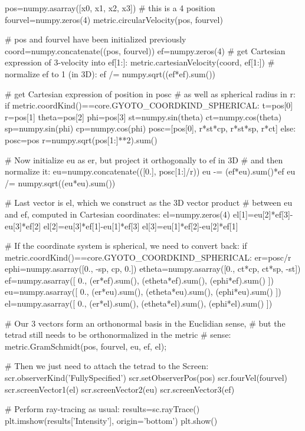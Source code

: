 \documentclass[a4paper,12pt]{article}
\begin{document}
\begin{code}
  pos=numpy.asarray([x0, x1, x2, x3]) # this is a 4 position
  fourvel=numpy.zeros(4)
  metric.circularVelocity(pos, fourvel)

  # pos and fourvel have been initialized previously
  coord=numpy.concatenate((pos, fourvel))
  ef=numpy.zeros(4)
  # get Cartesian expression of 3-velocity into ef[1:]:
  metric.cartesianVelocity(coord, ef[1:])
  # normalize ef to 1 (in 3D):
  ef /= numpy.sqrt((ef*ef).sum())

  # get Cartesian expression of position in posc
  # as well as spherical radius in r:
  if metric.coordKind()==core.GYOTO_COORDKIND_SPHERICAL:
      t=pos[0]
      r=pos[1]
      theta=pos[2]
      phi=pos[3]
      st=numpy.sin(theta)
      ct=numpy.cos(theta)
      sp=numpy.sin(phi)
      cp=numpy.cos(phi)
      posc=[pos[0], r*st*cp, r*st*sp, r*ct]
  else:
      posc=pos
      r=numpy.sqrt(pos[1:]**2).sum()

  # Now initialize eu as er, but project it orthogonally to ef in 3D
  # and then normalize it:    
  eu=numpy.concatenate(([0.], posc[1:]/r))
  eu -= (ef*eu).sum()*ef
  eu /= numpy.sqrt((eu*eu).sum())

  # Last vector is el, which we construct as the 3D vector product
  # between eu and ef, computed in Cartesian coordinates:
  el=numpy.zeros(4)
  el[1]=eu[2]*ef[3]-eu[3]*ef[2]
  el[2]=eu[3]*ef[1]-eu[1]*ef[3]
  el[3]=eu[1]*ef[2]-eu[2]*ef[1]

  # If the coordinate system is spherical, we need to convert back:
  if metric.coordKind()==core.GYOTO_COORDKIND_SPHERICAL:
      er=posc/r
      ephi=numpy.asarray([0., -sp, cp, 0.])
      etheta=numpy.asarray([0., ct*cp, ct*sp, -st])
      ef=numpy.asarray([
        0.,
        (er*ef).sum(),
        (etheta*ef).sum(),
        (ephi*ef).sum()
      ])
      eu=numpy.asarray([
        0.,
        (er*eu).sum(),
        (etheta*eu).sum(),
        (ephi*eu).sum()
      ])
      el=numpy.asarray([
        0.,
        (er*el).sum(),
        (etheta*el).sum(),
        (ephi*el).sum()
      ])

  # Our 3 vectors form an orthonormal basis in the Euclidian sense,
  # but the tetrad still needs to be orthonormalized in the metric
  # sense:
  metric.GramSchmidt(pos, fourvel, eu, ef, el);

  # Then we just need to attach the tetrad to the Screen:
  scr.observerKind('FullySpecified')
  scr.setObserverPos(pos)
  scr.fourVel(fourvel)
  scr.screenVector1(el)
  scr.screenVector2(eu)
  scr.screenVector3(ef)

  # Perform ray-tracing as usual:
  results=sc.rayTrace()
  plt.imshow(results['Intensity'], origin='bottom')
  plt.show()
 
\end{code}
\end{document}
